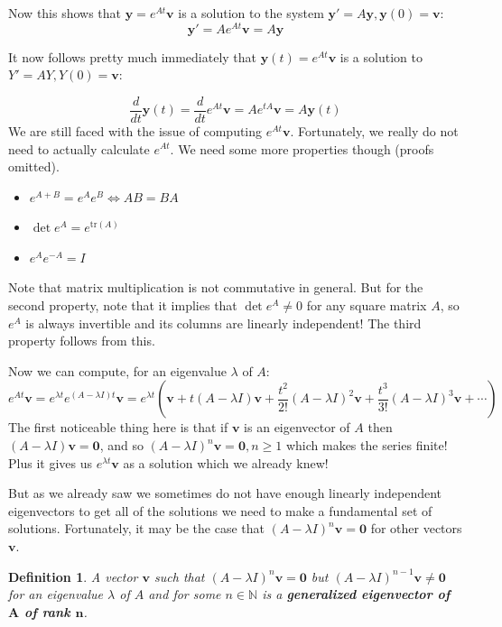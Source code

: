 \documentclass[letterpaper, 11pt, openany]{book}
\theoremstyle{mytheoremstyle}
\newtheorem{definition}{Definition}[section]
\theoremstyle{myexamplestyle}
\begin{document}
Now this shows that \(\mathbf{y} = e^{At}\mathbf{v}\) is a solution to the system \(\mathbf{y}' = A \mathbf{y}, \mathbf{y}(0) = \mathbf{v}\):
\[\mathbf{y}' = Ae^{At}\mathbf{v} = A \mathbf{y}\]


It now follows pretty much immediately that \(\mathbf{y}(t) = e^{At}\mathbf{v}\) is a solution to \(Y' = AY, Y(0) = \mathbf{v}\):

\[\frac{d}{dt} \mathbf{y}(t) = \frac{d}{dt} e^{At}\mathbf{v} = Ae^{tA}\mathbf{v} = A\mathbf{y}(t)\]
We are still faced with the issue of computing \(e^{At}\mathbf{v}\). Fortunately, we really do not need to actually calculate \(e^{At}\). We need some more properties though (proofs omitted).
\begin{itemize}
    \item \(e^{A+B}=e^{A}e^{B} \Leftrightarrow AB = BA\)
    \item \(\det e^{A} = e^{\text{tr} (A)}\)
    \item \(e^{A}e^{-A} = I\)
\end{itemize}
Note that matrix multiplication is not commutative in general. But for the second property, note that it implies that \(\det e^{A} \neq 0\) for any square matrix \(A\), so \(e^{A}\) is always invertible and its columns are linearly independent! The third property follows from this.

Now we can compute, for an eigenvalue \(\lambda\) of \(A\):
\[e^{At}\mathbf{v} = e^{\lambda t} e^{(A-\lambda I)t} \mathbf{v} = e^{\lambda t}\left(\mathbf{v} + t(A - \lambda I)\mathbf{v} + \frac{t^{2}}{2!}(A - \lambda I)^{2}\mathbf{v} + \frac{t^{3}}{3!}(A - \lambda I)^{3}\mathbf{v} + \cdots\right)\]
The first noticeable thing here is that if \(\mathbf{v}\) is an eigenvector of \(A\) then \((A - \lambda I)\mathbf{v} = \bm{0}\), and so \((A - \lambda I)^{n}\mathbf{v} = \bm{0}, n \geq 1\) which makes the series finite! Plus it gives us \(e^{\lambda t}\mathbf{v}\) as a solution which we already knew!

But as we already saw we sometimes do not have enough linearly independent eigenvectors to get all of the solutions we need to make a fundamental set of solutions. Fortunately, it may be the case that \((A - \lambda I)^{n}\mathbf{v} = \bm{0}\) for other vectors \(\mathbf{v}\).

\begin{definition}\label{d:generalized-evect}
    A vector \(\mathbf{v}\) such that \((A - \lambda I)^{n}\mathbf{v} = \bm{0}\) but \((A - \lambda I)^{n-1}\mathbf{v} \neq \bm{0}\) for an eigenvalue \(\lambda\) of \(A\) and for some \(n \in \mathbb{N}\) is a \textbf{generalized eigenvector of \(\bm{A}\) of rank \(\bm{n}\)}.
\end{definition}
\end{document}

